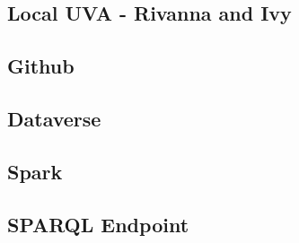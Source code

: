 \subsection{Local UVA - Rivanna and Ivy}
\subsection{Github}
\subsection{Dataverse}
\subsection{Spark}
\subsection{SPARQL Endpoint}
